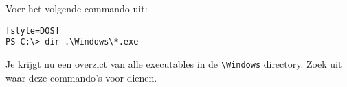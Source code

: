 Voer het volgende commando uit:
\begin{lstlisting}[language=basic][style=DOS]
PS C:\> dir .\Windows\*.exe
\end{lstlisting}
Je krijgt nu een overzict van alle executables in de \texttt{\textbackslash Windows} directory. Zoek uit waar deze commando's voor dienen.


